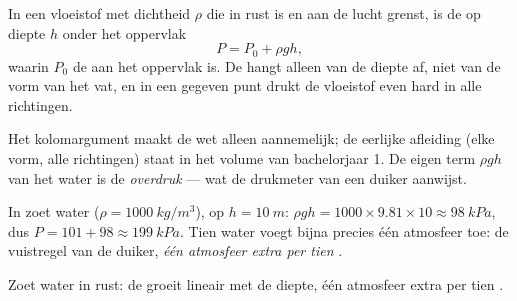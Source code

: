 \begin{theorem}\label{thm:g10:pressure:depth}
In een vloeistof met dichtheid $\rho$ die in rust is en aan de lucht
grenst, is de  op diepte $h$ onder het oppervlak
\[
P = P_0 + \rho g h,
\]
waarin $P_0$ de  aan het oppervlak is. De  hangt
alleen van de diepte af, niet van de vorm van het vat, en in een gegeven
punt drukt de vloeistof even hard in alle richtingen.
\end{theorem}
\admitted

\begin{remark}
Het kolomargument maakt de wet alleen aannemelijk; de eerlijke afleiding
(elke vorm, alle richtingen) staat in het volume van bachelorjaar 1. De
eigen term $\rho g h$ van het water is de \emph{overdruk}
--- wat de drukmeter van een duiker aanwijst.
\end{remark}

\begin{example}\label{ex:g10:pressure:tenmetres}
In zoet water ($\rho = \qty{1000}{kg/m^3}$), op $h = \qty{10}{m}$:
$\rho g h = 1000 \times 9.81 \times 10 \approx \qty{98}{kPa}$, dus
$P = 101 + 98 \approx \qty{199}{kPa}$. Tien  water voegt bijna
precies één atmosfeer toe: de vuistregel van de duiker, \emph{één
atmosfeer extra per tien }.
\end{example}

\begin{omfigure}

{\small Zoet water in rust: de  groeit lineair met de diepte, één
atmosfeer extra per tien .}
\end{omfigure}

